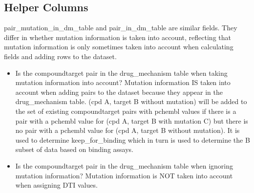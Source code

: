 \documentclass[letterpaper,10pt,english]{sphinxmanual}
\begin{document}
\subsection{Helper Columns}
\label{\detokenize{columns_docs:id11}}
\sphinxAtStartPar
pair\_mutation\_in\_dm\_table and pair\_in\_dm\_table are similar fields.
They differ in whether mutation information is taken into account,
reflecting that mutation information is only sometimes taken into account
when calculating fields and adding rows to the dataset.
\begin{itemize}
\item {} \begin{description}
\sphinxAtStartPar
Is the compound\sphinxhyphen{}target pair in the drug\_mechanism table
when taking mutation information into account?
Mutation information IS taken into account when adding pairs to the dataset
because they appear in the drug\_mechanism table.
(cpd A, target B without mutation) will be added to the set of existing
compound\sphinxhyphen{}target pairs with pchembl values
if there is a pair with a pchembl value for (cpd A, target B with mutation C)
but there is no pair with a pchembl value for (cpd A, target B without mutation).
It is used to determine keep\_for\_binding which in turn is used
to determine the B subset of data based on binding assays.

\end{description}

\item {} \begin{description}
\sphinxAtStartPar
Is the compound\sphinxhyphen{}target pair in the drug\_mechanism table
when ignoring mutation information?
Mutation information is NOT taken into account when assigning DTI values.

\end{description}

\end{itemize}
\end{document}
